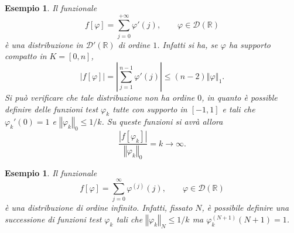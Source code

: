 \documentclass[italian,a4paper,oneside,headinclude]{scrbook}
\renewcommand{\phi}{\varphi}
\newcommand{\D}{\mathcal D}
\newcommand{\RR}{\mathbb R}
\newcommand{\abs}[1]{{\left|#1\right|}}
\newcommand{\Abs}[1]{{\left\Vert #1\right\Vert}}
\newtheorem{example}[theorem]{Esempio}
\begin{document}
\begin{example}
  Il funzionale
  \[
  f[\phi] = \sum_{j=0}^{+\infty}\phi'(j), \qquad \phi \in \D(\RR)
  \]
  è una distribuzione in $\D'(\RR)$ di ordine $1$.
  Infatti si ha, se $\phi$ ha supporto compatto in $K=[0,n]$,
  \[
  \abs{f[\phi]} = \abs{\sum_{j=1}^{n-1} \phi'(j)} \le (n-2) \Abs{\phi}_1.
  \]
  Si può verificare che tale distribuzione non ha ordine $0$, in
  quanto è possible definire delle funzioni test $\phi_k$ tutte con
  supporto in $[-1,1]$ e tali che
  $\phi_k'(0)=1$ e $\Abs{\phi_k}_0\le 1/k$. Su queste funzioni si
  avrà allora
  \[
  \frac{\abs{f[\phi_k]}}{\Abs{\phi_k}_0} = k \to \infty.
  \]
\end{example}

\begin{example}
  Il funzionale
  \[
  f[\phi] = \sum_{j=0}^\infty \phi^{(j)}(j), \qquad \phi \in \D(\RR)
  \]
  è una distribuzione di ordine infinito. Infatti, fissato $N$,
  è possibile definire
  una successione di funzioni test $\phi_k$ tali che
  $\Abs{\phi_k}_N \le 1/k$  ma
  $\phi_k^{(N+1)}(N+1) = 1$.
\end{example}
\end{document}
